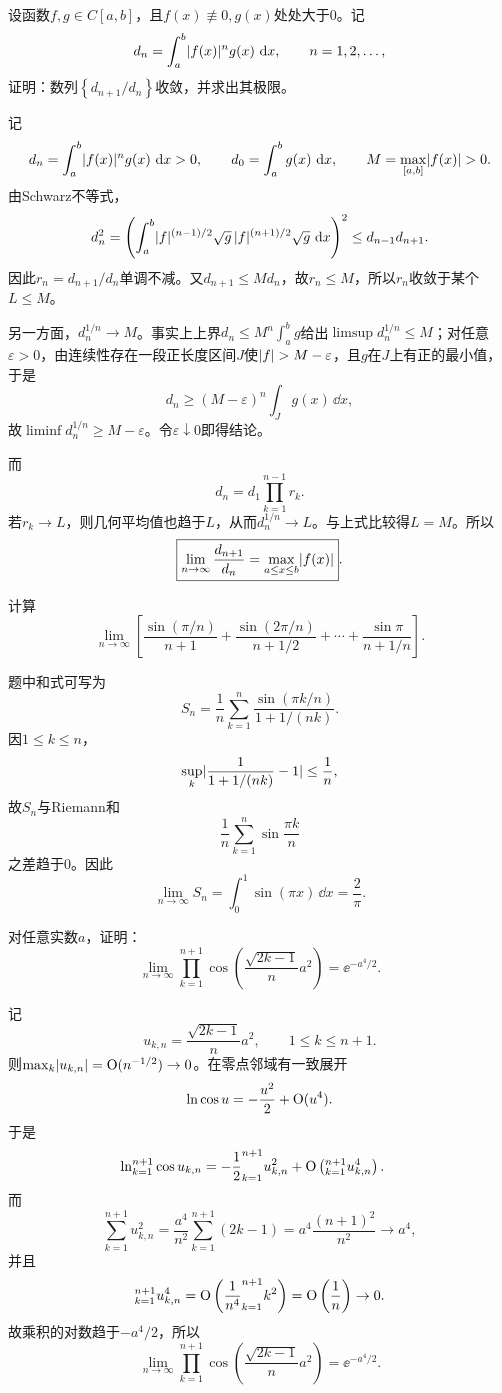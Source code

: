 \begin{xreferenceproblem}[7]
设函数$f,g\in C[a,b]$，且$f(x)\not\equiv0,g(x)$处处大于0。记
  \[
    d_n=\int_a^b\lvert f(x)\rvert^ng(x)\,\mathop{}\!\mathrm{d} x,\qquad n=1,2,\ldots,
  \]
  证明：数列$\left\{d_{n+1}/d_n\right\}$收敛，并求出其极限。
\end{xreferenceproblem}
\begin{xsolution}
记
\[
 d_n=\int_a^b\lvert f(x)\rvert^ng(x)\,\mathop{}\!\mathrm{d} x>0,
 \qquad
 d_0=\int_a^bg(x)\,\mathop{}\!\mathrm{d} x,
 \qquad
 M=\max_{[a,b]}\lvert f(x)\rvert>0.
\]
由Schwarz不等式，
\[
 d_n^2
 =\left(\int_a^b
 \lvert f\rvert^{(n-1)/2}\sqrt{g}\,
 \lvert f\rvert^{(n+1)/2}\sqrt{g}\,\mathop{}\!\mathrm{d} x\right)^2
 \le d_{n-1}d_{n+1}.
\]
因此$r_n=d_{n+1}/d_n$单调不减。又$d_{n+1}\le Md_n$，故$r_n\le M$，所以$r_n$收敛于某个$L\le M$。

另一方面，$d_n^{1/n}\to M$。事实上上界$d_n\le M^n\int_a^bg$给出$\limsup d_n^{1/n}\le M$；对任意$\varepsilon>0$，由连续性存在一段正长度区间$J$使$\lvert f\rvert>M-\varepsilon$，且$g$在$J$上有正的最小值，于是
\[
 d_n\ge(M-\varepsilon)^n\int_Jg(x)\,\dd x,
\]
故$\liminf d_n^{1/n}\ge M-\varepsilon$。令$\varepsilon\downarrow0$即得结论。

而
\[
 d_n=d_1\prod_{k=1}^{n-1}r_k.
\]
若$r_k\to L$，则几何平均值也趋于$L$，从而$d_n^{1/n}\to L$。与上式比较得$L=M$。所以
\[
 \boxed{\lim_{n\to\infty}\frac{d_{n+1}}{d_n}
 =\max_{a\le x\le b}\lvert f(x)\rvert}.
\]
\end{xsolution}


\begin{xreferenceproblem}[8]
计算
  \[
    \lim_{n\to\infty}\left[
    \frac{\sin(\pi/n)}{n+1}
    +\frac{\sin(2\pi/n)}{n+1/2}
    +\cdots+
    \frac{\sin\pi}{n+1/n}
    \right].
  \]
\end{xreferenceproblem}
\begin{xsolution}
题中和式可写为
\[
 S_n=\frac1n\sum_{k=1}^n
 \frac{\sin(\pi k/n)}{1+1/(nk)}.
\]
因$1\le k\le n$，
\[
 \sup_k\lvert\frac1{1+1/(nk)}-1\rvert\le\frac1n,
\]
故$S_n$与Riemann和
\[
 \frac1n\sum_{k=1}^n\sin\frac{\pi k}{n}
\]
之差趋于0。因此
\[
 \lim_{n\to\infty}S_n
 =\int_0^1\sin(\pi x)\,\dd x
 =\boxed{\frac2\pi}.
\]
\end{xsolution}


\begin{xreferenceproblem}[9]
对任意实数$a$，证明：
  \[
    \lim_{n\to\infty}\prod_{k=1}^{n+1}
    \cos\left(\frac{\sqrt{2k-1}}{n}a^2\right)
    =\ee^{-a^4/2}.
  \]
\end{xreferenceproblem}
\begin{xsolution}
记
\[
 u_{k,n}=\frac{\sqrt{2k-1}}{n}a^2,
 \qquad 1\le k\le n+1.
\]
则$\max_k\lvert u_{k,n}\rvert=\mathrm{O}(n^{-1/2})\to0$。在零点邻域有一致展开
\[
 \ln\cos u=-\frac{u^2}{2}+\mathrm{O}(u^4).
\]
于是
\begin{align*}
\ln\relax_{k=1}^{n+1}\cos u_{k,n}
&=-\frac12\relax_{k=1}^{n+1}u_{k,n}^2
 +\mathrm{O}\left(\relax_{k=1}^{n+1}u_{k,n}^4\right).
\end{align*}
而
\[
 \sum_{k=1}^{n+1}u_{k,n}^2
 =\frac{a^4}{n^2}\sum_{k=1}^{n+1}(2k-1)
 =a^4\frac{(n+1)^2}{n^2}\to a^4,
\]
并且
\[
 \relax_{k=1}^{n+1}u_{k,n}^4
 =\mathrm{O}\left(\frac1{n^4}\relax_{k=1}^{n+1}k^2\right)
 =\mathrm{O}\left(\frac1n\right)\to0.
\]
故乘积的对数趋于$-a^4/2$，所以
\[
 \boxed{\lim_{n\to\infty}\prod_{k=1}^{n+1}
 \cos\left(\frac{\sqrt{2k-1}}n a^2\right)=\ee^{-a^4/2}}.
\]
\end{xsolution}


